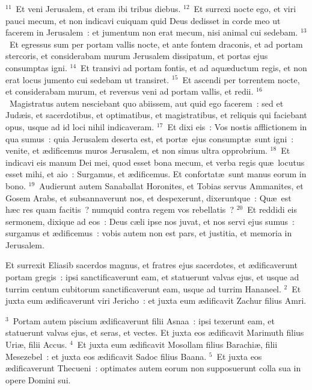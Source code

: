 ${}^{11}$~Et veni Jerusalem, et eram ibi tribus diebus.
${}^{12}$~Et surrexi nocte ego, et viri pauci mecum, et non indicavi cuiquam quid Deus dedisset in corde meo ut facerem in Jerusalem~: et jumentum non erat mecum, nisi animal cui sedebam.
${}^{13}$~Et egressus sum per portam vallis nocte, et ante fontem draconis, et ad portam stercoris, et considerabam murum Jerusalem dissipatum, et portas ejus consumptas igni.
${}^{14}$~Et transivi ad portam fontis, et ad aqu\ae ductum regis, et non erat locus jumento cui sedebam ut transiret.
${}^{15}$~Et ascendi per torrentem nocte, et considerabam murum, et reversus veni ad portam vallis, et redii.
${}^{16}$~Magistratus autem nesciebant quo abiissem, aut quid ego facerem~: sed et Jud\ae is, et sacerdotibus, et optimatibus, et magistratibus, et reliquis qui faciebant opus, usque ad id loci nihil indicaveram.
${}^{17}$~Et dixi eis~: Vos nostis afflictionem in qua sumus~: quia Jerusalem deserta est, et port\ae\ ejus consumpt\ae\ sunt igni~: venite, et \ae dificemus muros Jerusalem, et non simus ultra opprobrium.
${}^{18}$~Et indicavi eis manum Dei mei, quod esset bona mecum, et verba regis qu\ae\ locutus esset mihi, et aio~: Surgamus, et \ae dificemus. Et confortat\ae\ sunt manus eorum in bono.
${}^{19}$~Audierunt autem Sanaballat Horonites, et Tobias servus Ammanites, et Gosem Arabs, et subsannaverunt nos, et despexerunt, dixeruntque~: Qu\ae\ est h\ae c res quam facitis~? numquid contra regem vos rebellatis~?
${}^{20}$~Et reddidi eis sermonem, dixique ad eos~: Deus c\ae li ipse nos juvat, et nos servi ejus sumus~: surgamus et \ae dificemus~: vobis autem non est pars, et justitia, et memoria in Jerusalem.

\lettrine[lines=10,image=true,loversize=0.05,lraise=-0.03]{E}{}t surrexit Eliasib sacerdos magnus, et fratres ejus sacerdotes, et \ae dificaverunt portam gregis~: ipsi sanctificaverunt eam, et statuerunt valvas ejus, et usque ad turrim centum cubitorum sanctificaverunt eam, usque ad turrim Hananeel.
${}^{2}$~Et juxta eum \ae dificaverunt viri Jericho~: et juxta eum \ae dificavit Zachur filius Amri.


${}^{3}$~Portam autem piscium \ae dificaverunt filii Asnaa~: ipsi texerunt eam, et statuerunt valvas ejus, et seras, et vectes. Et juxta eos \ae dificavit Marimuth filius Uri\ae , filii Accus.
${}^{4}$~Et juxta eum \ae dificavit Mosollam filius Barachi\ae , filii Mesezebel~: et juxta eos \ae dificavit Sadoc filius Baana.
${}^{5}$~Et juxta eos \ae dificaverunt Thecueni~: optimates autem eorum non supposuerunt colla sua in opere Domini sui.


